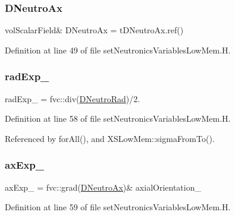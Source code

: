 \subsubsection{\texorpdfstring{D\+Neutro\+Ax}{DNeutroAx}}
{\footnotesize\ttfamily vol\+Scalar\+Field\& D\+Neutro\+Ax = t\+D\+Neutro\+Ax.\+ref()}



Definition at line 49 of file set\+Neutronics\+Variables\+Low\+Mem.\+H.

\mbox{\label{setNeutronicsVariablesLowMem_8H_a526ceca549702fe9fb823405772ca135}} 
\subsubsection{\texorpdfstring{rad\+Exp\+\_\+}{radExp\_}}
{\footnotesize\ttfamily rad\+Exp\+\_\+ = fvc\+::div(\hyperlink{setNeutronicsVariablesLowMem_8H_a87a8e73540cc64ca6321cea333ded9ac}{D\+Neutro\+Rad})/2.}



Definition at line 58 of file set\+Neutronics\+Variables\+Low\+Mem.\+H.



Referenced by for\+All(), and X\+S\+Low\+Mem\+::sigma\+From\+To().

\mbox{\label{setNeutronicsVariablesLowMem_8H_a66bc5cc5f255b83ba2c9eb0c3a1f52cc}} 
\subsubsection{\texorpdfstring{ax\+Exp\+\_\+}{axExp\_}}
{\footnotesize\ttfamily ax\+Exp\+\_\+ = fvc\+::grad(\hyperlink{setNeutronicsVariablesLowMem_8H_acbede4ae4993afe497317c8781340cb6}{D\+Neutro\+Ax})\& axial\+Orientation\+\_\+}



Definition at line 59 of file set\+Neutronics\+Variables\+Low\+Mem.\+H.



